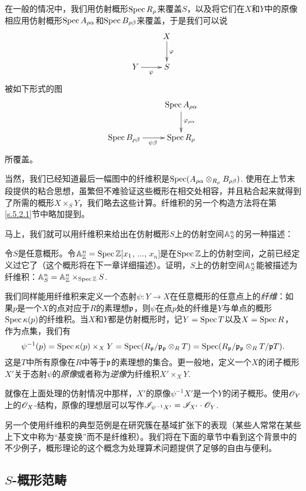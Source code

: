 在一般的情况中，我们用仿射概形$\operatorname{Spec} R_\rho$来覆盖$S$，以及将它们在$X$和$Y$中的原像相应用仿射概形$\operatorname{Spec} A_{\rho\alpha}$和$\operatorname{Spec} B_{\rho\beta}$来覆盖，于是我们可以说
\[
	\xymatrix{
	&X\ar[d]^\varphi\\
	Y\ar[r]_\psi &S
	}
\]
被如下形式的图
\[
	\xymatrix{
	&\spec A_{\rho\alpha}\ar[d]^{\varphi_{\rho\alpha}}\\
	\spec B_{\rho\beta}\ar[r]_{\psi\beta} &\spec R_{\rho}
	}
\]
所覆盖。

当然，我们已经知道最后一幅图中的纤维积是$\operatorname{Spec}(A_{\rho\alpha}\otimes_{R_\rho}B_{\rho\beta})$. 使用在上节末段提供的粘合思想，虽繁但不难验证这些概形在相交处相容，并且粘合起来就得到了所需的概形$X\times_S Y$，我们略去这些计算。纤维积的另一个构造方法将在第\ref{s.5.2.1}节中略加提到。

马上，我们就可以用纤维积来给出在仿射概形$S$上的仿射空间$\mathbb{A}_S^n$的另一种描述：

\begin{exe}
令$S$是任意概形。令$\mathbb{A}_{\mathbb{Z}}^n=\operatorname{Spec} \mathbb{Z}[x_1$, $\dots$, $x_n]$是在$\operatorname{Spec} \mathbb{Z}$上的仿射空间，之前已经定义过它了（这个概形将在下一章详细描述）。证明，$S$上的仿射空间$\mathbb{A}_S^n$能被描述为纤维积：$\mathbb{A}_S^n=\mathbb{A}_{\mathbb{Z}}^n\times_{\operatorname{Spec} \mathbb{Z}} S$.
\end{exe}

我们同样能用纤维积来定义一个态射$\psi:Y\to X$在任意概形的任意点上的\textit{纤维}：如果$p$是一个$X$的点对应于$R$的素理想$\mathfrak{p}$，则$\psi$在点$p$处的纤维是$Y$与单点的概形$\operatorname{Spec} \kappa(p)$的纤维积。当$X$和$Y$都是仿射概形时，记$Y=\operatorname{Spec} T$以及$X=\operatorname{Spec} R$，作为点集，我们有
\[
	\psi^{-1}(p)=\operatorname{Spec} \kappa(p)\times_X Y=\operatorname{Spec} (R_{\mathfrak{p}} /\mathfrak{p}_{\mathfrak{p}} \otimes_R T)=\operatorname{Spec} (R_{\mathfrak{p}}/\mathfrak{p}_{\mathfrak{p}} \otimes_R T/\mathfrak{p} T).
\]
这是$T$中所有原像在$R$中等于$\mathfrak{p}$的素理想的集合。更一般地，定义一个$X$的闭子概形$X'$关于态射$\psi$的\textit{原像}或者称为\textit{逆像}为纤维积$X'\times_X Y$.

就像在上面处理的仿射情况中那样，$X'$的原像$\psi^{-1}X'$是一个$Y$的闭子概形。使用$\mathscr{O}_Y$上的$\mathscr{O}_X$\hyp 结构，原像的理想层可以写作$\mathscr{I}_{\psi^{-1} X'}=\mathscr{I}_{X'}\cdot \mathscr{O}_Y$.

另一个使用纤维积的典型范例是在研究簇在基域扩张下的表现（某些人常常在某些上下文中称为“基变换”而不是纤维积）。我们将在下面的章节中看到这个背景中的不少例子，概形理论的这个概念为处理算术问题提供了足够的自由与便利。

\nottran

\subsection{\texorpdfstring{$S$}{S}\hyp 概形范畴}

